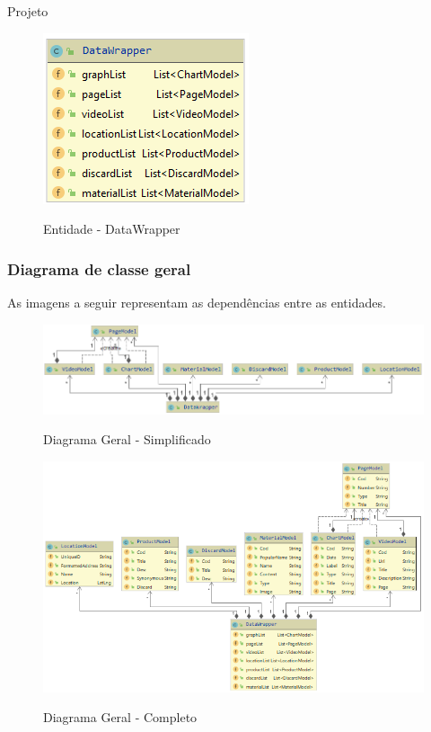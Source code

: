 \documentclass[
	12pt,				%
	openright,			%
	twoside,			%
	a4paper,			%
	english,			%
	french,				%
	spanish,			%
	brazil				%
	]{abntex2}
\begin{document}
\begin{chapter}{Projeto}
\begin{enumerate}
\begin{itemize}
\end{itemize}
\begin{figure}[h]
\centering
   \caption{Entidade - DataWrapper}
   \includegraphics[scale=1.0]{media/DataWrapperModel.png}
     \label{fig:datawrapper}
\end{figure}
\end{enumerate}

\newpage
\subsubsection{Diagrama de classe geral}
As imagens a seguir representam as dependências entre as entidades.

\begin{figure}[h]
\centering
   \caption{Diagrama Geral - Simplificado}
   \includegraphics[scale=0.7]{media/DataWrapper_.png}
     \label{fig:datawrapper_simp}
\end{figure}

\begin{figure}[h]
\centering
   \caption{Diagrama Geral - Completo}
   \includegraphics[scale=0.85]{media/DataWrapper.png}
     \label{fig:datawrapper_comp}
\end{figure}


\end{chapter}
\end{document}
